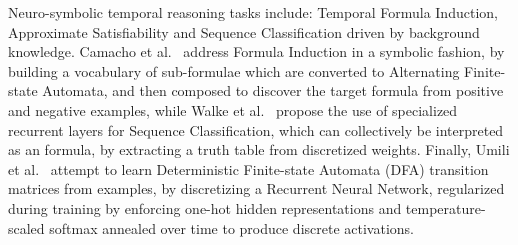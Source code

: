 Neuro-symbolic temporal reasoning tasks include: Temporal Formula Induction, Approximate Satisfiability and Sequence Classification driven by background knowledge.
Camacho et al.~\cite{camacho2019learning} address Formula Induction in a symbolic fashion, by building a vocabulary of sub-formulae which are converted to Alternating Finite-state Automata, and then composed to discover the target formula from positive and negative examples, while Walke et al.~\cite{walke2021learning} propose the use of specialized recurrent layers for Sequence Classification, which can collectively be interpreted as an \LTLf formula, by extracting a truth table from discretized weights.
Finally, Umili et al.~\cite{umili2024deepdfa} attempt to learn Deterministic Finite-state Automata (DFA) transition matrices from examples, by discretizing a Recurrent Neural Network, regularized during training by enforcing one-hot hidden representations and temperature-scaled softmax annealed over time
to produce discrete activations.

